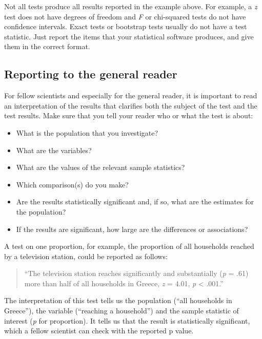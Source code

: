 \documentclass[a4paper]{book}
\theoremstyle{definition}
\theoremstyle{definition}
\theoremstyle{definition}
\theoremstyle{remark}
\begin{document}
Not all tests produce all results reported in the example above. For
example, a \emph{z} test does not have degrees of freedom and \emph{F}
or chi-squared tests do not have confidence intervals. Exact tests or
bootstrap tests usually do not have a test statistic. Just report the
items that your statistical software produces, and give them in the
correct format.

\subsection{Reporting to the general
reader}\label{reporting-to-the-general-reader}

For fellow scientists and especially for the general reader, it is
important to read an interpretation of the results that clarifies both
the subject of the test and the test results. Make sure that you tell
your reader who or what the test is about:

\begin{itemize}
\item
  What is the population that you investigate?
\item
  What are the variables?
\item
  What are the values of the relevant sample statistics?
\item
  Which comparison(s) do you make?
\item
  Are the results statistically significant and, if so, what are the
  estimates for the population?
\item
  If the results are significant, how large are the differences or
  associations?
\end{itemize}

A test on one proportion, for example, the proportion of all households
reached by a television station, could be reported as follows:

\begin{quote}
``The television station reaches significantly and substantially
(\emph{p} = .61) more than half of all households in Greece, \emph{z} =
4.01, \emph{p} \textless{} .001.''
\end{quote}

The interpretation of this test tells us the population (``all
households in Greece''), the variable (``reaching a household'') and the
sample statistic of interest (\emph{p} for proportion). It tells us that
the result is statistically significant, which a fellow scientist can
check with the reported p value.
\end{document}
